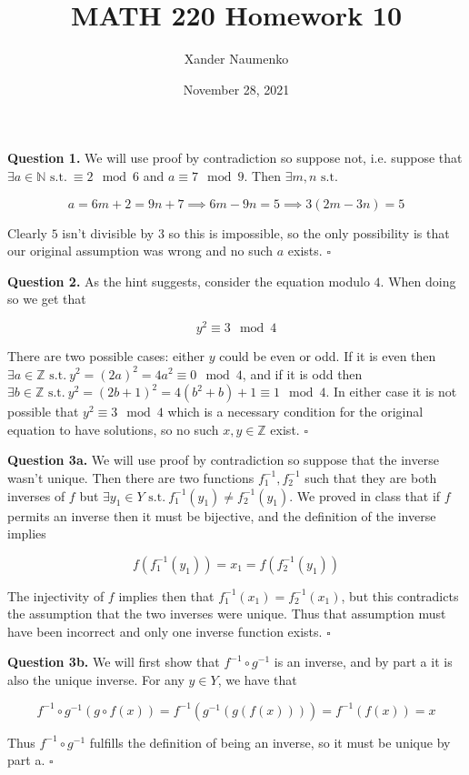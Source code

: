 \documentclass[letterpaper, reqno,11pt]{article}
\newcommand{\ZZ}{\mathbb{Z}}
\newcommand{\NN}{\mathbb{N}}
\newcommand{\st}{\text{ s.t.}\ }
\begin{document}
\title{MATH 220 Homework 10}
\date{November 28, 2021}
\author{Xander Naumenko}
\maketitle

{\noindent\bf Question 1.} We will use proof by contradiction so suppose not, i.e. suppose that $\exists a\in\NN\st\equiv 2\mod6$ and $a\equiv7\mod9$. Then $\exists m, n\st$

\[
    a=6m+2=9n+7\implies 6m-9n=5\implies 3(2m-3n)=5
\]

Clearly $5$ isn't divisible by $3$ so this is impossible, so the only possibility is that our original assumption was wrong and no such $a$ exists. $\square$

{\noindent\bf Question 2.} As the hint suggests, consider the equation modulo $4$. When doing so we get that 

\[
    y^2\equiv 3\mod 4
\]

There are two possible cases: either $y$ could be even or odd. If it is even then $\exists a\in\ZZ\st y^2=(2a)^2=4a^2\equiv 0\mod 4$, and if it is odd then $\exists b\in\ZZ\st y^2=(2b+1)^2=4(b^2+b)+1\equiv 1\mod4$. In either case it is not possible that $y^2\equiv 3\mod4$ which is a necessary condition for the original equation to have solutions, so no such $x, y\in\ZZ$ exist. $\square$

{\noindent\bf Question 3a.} We will use proof by contradiction so suppose that the inverse wasn't unique. Then there are two functions $f_1^{-1}, f_2^{-1}$ such that they are both inverses of $f$ but $\exists y_1\in Y\st f_1^{-1}(y_1)\neq f_2^{-1}(y_1)$. We proved in class that if $f$ permits an inverse then it must be bijective, and the definition of the inverse implies

\[
    f(f_1^{-1}(y_1))=x_1=f(f_2^{-1}(y_1))
\]

The injectivity of $f$ implies then that $f_1^{-1}(x_1)= f_2^{-1}(x_1)$, but this contradicts the assumption that the two inverses were unique. Thus that assumption must have been incorrect and only one inverse function exists. $\square$

{\noindent\bf Question 3b.} We will first show that $f^{-1}\circ g^{-1}$ is an inverse, and by part a it is also the unique inverse. For any $y\in Y$, we have that 

\[
    f^{-1}\circ g^{-1} (g\circ f(x))=f^{-1}(g^{-1}(g(f(x))))=f^{-1}(f(x))=x
\]

Thus $f^{-1}\circ g^{-1}$ fulfills the definition of being an inverse, so it must be unique by part a. $\square$
\end{document}
